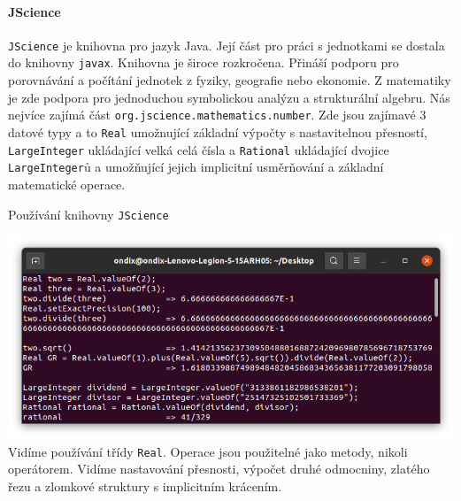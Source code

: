 \paragraph{JScience \cite{jscience}}
\texttt{JScience} je knihovna pro jazyk Java. Její část pro práci s jednotkami se dostala do knihovny \texttt{javax}. Knihovna je široce rozkročena. Přináší podporu pro porovnávání a počítání jednotek z fyziky, geografie nebo ekonomie. Z matematiky je zde podpora pro jednoduchou symbolickou analýzu a strukturální algebru. Nás nejvíce zajímá část \texttt{org.jscience.mathematics.number}. Zde jsou zajímavé 3 datové typy a to \texttt{Real} umožnující základní výpočty s nastavitelnou přesností, \texttt{LargeInteger} ukládající velká celá čísla a \texttt{Rational} ukládající dvojice \texttt{LargeInteger}ů a umožňující jejich implicitní usměrňování a základní matematické operace.

\begin{myfigure}{}
\caption{Používání knihovny \texttt{JScience}}
\includegraphics[width=\linewidth]{./graphics/jscience.png}\label{obr:jscience}
Vidíme používání třídy \texttt{Real}. Operace jsou použitelné jako metody, nikoli operátorem. Vidíme nastavování přesnosti, výpočet druhé odmocniny, zlatého řezu a zlomkové struktury s implicitním krácením.
\end{myfigure}

